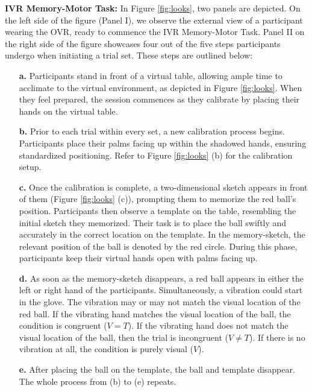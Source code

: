 \documentclass[12pt,oneside,openright]{report}
\begin{document}
\textbf{IVR Memory-Motor Task:} In Figure \ref{fig:looks}, two panels are depicted. On the left side of the figure (Panel I), we observe the external view of a participant wearing the OVR, ready to commence the IVR Memory-Motor Task. Panel II on the right side of the figure showcases four out of the five steps participants undergo when initiating a trial set. These steps are outlined below:


\begin{enumerate}
    \item[\textbf{a.}] Participants stand in front of a virtual table, allowing ample time to acclimate to the virtual environment, as depicted in Figure \ref{fig:looks}. When they feel prepared, the session commences as they calibrate by placing their hands on the virtual table.

    \item[\textbf{b.}] Prior to each trial within every set, a new calibration process begins. Participants place their palms facing up within the shadowed hands, ensuring standardized positioning. Refer to Figure \ref{fig:looks} (b) for the calibration setup.
    
    \item[\textbf{c.}] Once the calibration is complete, a two-dimensional sketch appears in front of them (Figure \ref{fig:looks} (c)), prompting them to memorize the red ball's position. Participants then observe a template on the table, resembling the initial sketch they memorized. Their task is to place the ball swiftly and accurately in the correct location on the template. In the memory-sketch, the relevant position of the ball is denoted by the red circle. During this phase, participants keep their virtual hands open with palms facing up.
    
    \item[\textbf{d.}] As soon as the memory-sketch disappears, a red ball appears in either the left or right hand of the participants. Simultaneously, a vibration could start in the glove. The vibration may or may not match the visual location of the red ball. If the vibrating hand matches the visual location of the ball, the condition is congruent ($V=T$). If the vibrating hand does not match the visual location of the ball, then the trial is incongruent ($V \neq T$). If there is no vibration at all, the condition is purely visual ($V$).
   
    \item[\textbf{e.}] After placing the ball on the template, the ball and template disappear. The whole process from (b) to (e) repeats.
\end{enumerate}
\end{document}
